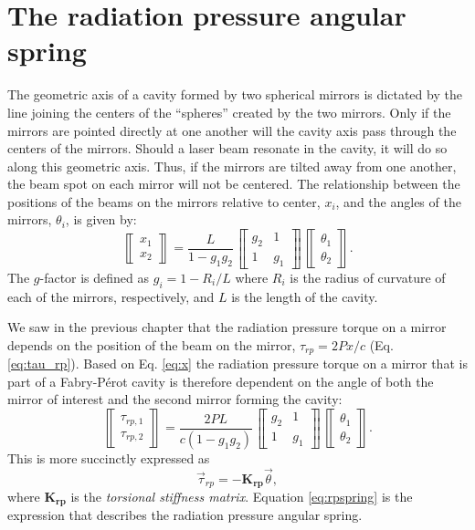\section{The radiation pressure angular spring}
The geometric axis of a cavity formed by two spherical mirrors is
dictated by the line joining the centers of the ``spheres'' created by
the two mirrors. Only if the mirrors are pointed directly at one
another will the cavity axis pass through the centers of the
mirrors. Should a laser beam resonate in the cavity, it will do so
along this geometric axis. Thus, if the mirrors are tilted away from
one another, the beam spot on each mirror will not be centered. The
relationship between the positions of the beams on the mirrors
relative to center, $x_i$, and the angles of the mirrors, $\theta_i$,
is given by:
\begin{equation}
\left\llbracket \begin{array}{c}
x_1\\
x_2 \end{array} \right\rrbracket = \frac{L}{1-g_1 g_2}
\left\llbracket \begin{array}{cc}
g_2 & 1\\
1 & g_1\end{array} \right\rrbracket
\left\llbracket \begin{array}{c}
\theta_1\\
\theta_2 \end{array} \right\rrbracket .
\label{eq:x}
\end{equation}
The $g$-factor is defined as $g_i=1-R_i/L$ where $R_i$ is the radius of
curvature of each of the mirrors, respectively, and $L$ is the length
of the cavity.

We saw in the previous chapter that the radiation pressure torque on a
mirror depends on the position of the beam on the mirror, $\tau_{rp} =
2 P x / c$ (Eq. \ref{eq:tau_rp}). Based on Eq. \ref{eq:x} the
radiation pressure torque on a mirror that is part of a
Fabry-P\'{e}rot cavity is therefore dependent on the angle of both the
mirror of interest and the second mirror forming the cavity:
\begin{equation}
\left\llbracket \begin{array}{c}
\tau_{rp,1}\\
\tau_{rp,2} \end{array} \right\rrbracket = \frac{2 P L}{c (1-g_1 g_2)}
\left\llbracket \begin{array}{cc}
g_2 & 1\\
1 & g_1\end{array} \right\rrbracket
\left\llbracket \begin{array}{c}
\theta_1\\
\theta_2 \end{array} \right\rrbracket.
\end{equation}
This is more succinctly expressed as
\begin{equation}
\vec{\tau}_{rp} = -\mathbf{K_{rp}} \vec{\theta},
\label{eq:rpspring}
\end{equation}
where $\mathbf{K_{rp}}$ is the \emph{torsional stiffness
  matrix}. Equation \ref{eq:rpspring} is the expression that describes
the radiation pressure angular spring.




